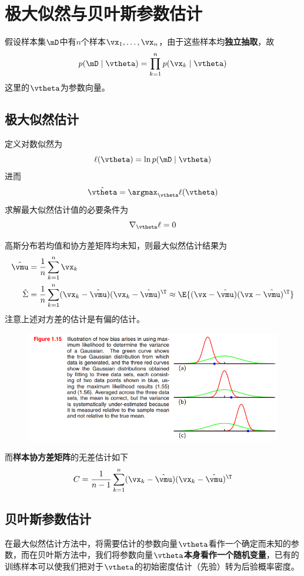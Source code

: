
\section{极大似然与贝叶斯参数估计} %

假设样本集$\mD$中有$n$个样本$\vx_1,\ldots,\vx_n$，由于这些样本均\textbf{独立抽取}，故
\[p(\mD\mid\vtheta)=\prod_{k=1}^np(\vx_k\mid\vtheta)\]
这里的$\vtheta$为参数向量。

\subsection{极大似然估计}
定义对数似然为
\[\ell(\vtheta)=\ln p(\mD\mid\vtheta)\]
进而
\[\hat{\vtheta}=\argmax_{\vtheta}\ell(\vtheta)\]
求解最大似然估计值的必要条件为
\[\nabla_{\vtheta}\ell = 0\]

高斯分布若均值和协方差矩阵均未知，则最大似然估计结果为
\[\begin{aligned}
\hat{\vmu} &= \frac{1}{n}\sum_{k=1}^n\vx_k\\
\hat{\Sigma} &= \frac{1}{n}\sum_{k=1}^n(\vx_k-\hat{\vmu})(\vx_k-\hat{\vmu})^\T\approx\E{(\vx-\hat{\vmu})(\vx-\hat{\vmu})^\T}
\end{aligned}\]
注意上述对方差的估计是有偏的估计。
\begin{figure}[H]
\centering
\includegraphics[width=0.8\linewidth]{fig/biased_ML_Gaussian.png}
\end{figure}

而\textbf{样本协方差矩阵}的无差估计如下
\[C=\frac{1}{n-1}\sum_{k=1}^n(\vx_k-\hat{\vmu})(\vx_k-\hat{\vmu})^\T\]

\subsection{贝叶斯参数估计}
在最大似然估计方法中，将需要估计的参数向量$\vtheta$看作一个确定而未知的参数，而在贝叶斯方法中，我们将参数向量$\vtheta$\textbf{本身看作一个随机变量}，已有的训练样本可以使我们把对于$\vtheta$的初始密度估计（先验）转为后验概率密度。


